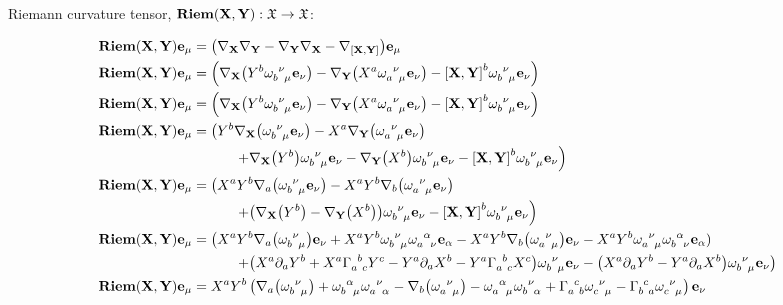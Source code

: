 Riemann curvature tensor, $\textbf{Riem}\qty(\vb X,\vb Y):\mathfrak X\rightarrow\mathfrak X$:

\begin{align*}
    \textbf{Riem}\qty(\vb X,\vb Y)\vb e_\mu&=\qty(\nabla_{\vb X}\nabla_{\vb Y}-\nabla_{\vb Y}\nabla_{\vb X}-\nabla_{\comm{\vb X}{\vb Y}})\vb e_\mu\\
    \textbf{Riem}\qty(\vb X,\vb Y)\vb e_\mu&=\qty(\nabla_{\vb X}\qty(Y^b\tensor{\omega}{_b^\nu_\mu}\vb e_\nu)-\nabla_{\vb Y}\qty(X^a\tensor{\omega}{_a^\nu_\mu}\vb e_\nu)-\comm{\vb X}{\vb Y}^b\tensor{\omega}{_b^\nu_\mu}\vb e_\nu)\\
    \textbf{Riem}\qty(\vb X,\vb Y)\vb e_\mu&=\qty(\nabla_{\vb X}\qty(Y^b\tensor{\omega}{_b^\nu_\mu}\vb e_\nu)-\nabla_{\vb Y}\qty(X^a\tensor{\omega}{_a^\nu_\mu}\vb e_\nu)-\comm{\vb X}{\vb Y}^b\tensor{\omega}{_b^\nu_\mu}\vb e_\nu)\\
    \textbf{Riem}\qty(\vb X,\vb Y)\vb e_\mu&=\left(Y^b\nabla_{\vb X}\qty(\tensor{\omega}{_b^\nu_\mu}\vb e_\nu)-X^a\nabla_{\vb Y}\qty(\tensor{\omega}{_a^\nu_\mu}\vb e_\nu)\right.\\
    &\quad\quad\quad\left.+\nabla_{\vb X}\qty(Y^b)\tensor{\omega}{_b^\nu_\mu}\vb e_\nu-\nabla_{\vb Y}\qty(X^b)\tensor{\omega}{_b^\nu_\mu}\vb e_\nu-\comm{\vb X}{\vb Y}^b\tensor{\omega}{_b^\nu_\mu}\vb e_\nu\right)\\
    \textbf{Riem}\qty(\vb X,\vb Y)\vb e_\mu&=\left(X^aY^b\nabla_{a}\qty(\tensor{\omega}{_b^\nu_\mu}\vb e_\nu)-X^aY^b\nabla_{b}\qty(\tensor{\omega}{_a^\nu_\mu}\vb e_\nu)\right.\\
    &\quad\quad\quad\left.+\qty(\nabla_{\vb X}\qty(Y^b)-\nabla_{\vb Y}\qty(X^b))\tensor{\omega}{_b^\nu_\mu}\vb e_\nu-\comm{\vb X}{\vb Y}^b\tensor{\omega}{_b^\nu_\mu}\vb e_\nu\right)\\
    \textbf{Riem}\qty(\vb X,\vb Y)\vb e_\mu&=\left(X^aY^b\nabla_{a}\qty(\tensor{\omega}{_b^\nu_\mu})\vb e_\nu+X^aY^b\tensor{\omega}{_b^\nu_\mu}\tensor{\omega}{_a^\alpha_\nu}\vb e_\alpha-X^aY^b\nabla_{b}\qty(\tensor{\omega}{_a^\nu_\mu})\vb e_\nu-X^aY^b\tensor{\omega}{_a^\nu_\mu}\tensor{\omega}{_b^\alpha_\nu}\vb e_\alpha)\right.\\
    &\quad\quad\quad\left.+\qty(X^a\partial_a Y^b+X^a\tensor{\Gamma}{_a^b_c}Y^c-Y^a\partial_aX^b-Y^a\tensor{\Gamma}{_a^b_c}X^c)\tensor{\omega}{_b^\nu_\mu}\vb e_\nu-\qty(X^a\partial_aY^b-Y^a\partial_a X^b)\tensor{\omega}{_b^\nu_\mu}\vb e_\nu\right)\\
    \textbf{Riem}\qty(\vb X,\vb Y)\vb e_\mu&=X^aY^b\left(\nabla_{a}\qty(\tensor{\omega}{_b^\nu_\mu})+\tensor{\omega}{_b^\alpha_\mu}\tensor{\omega}{_a^\nu_\alpha}-\nabla_{b}\qty(\tensor{\omega}{_a^\nu_\mu})-\tensor{\omega}{_a^\alpha_\mu}\tensor{\omega}{_b^\nu_\alpha}+\tensor{\Gamma}{_a^c_b}\tensor{\omega}{_c^\nu_\mu}-\tensor{\Gamma}{_b^c_a}\tensor{\omega}{_c^\nu_\mu}\right)\vb e_\nu\\

\end{align*}
